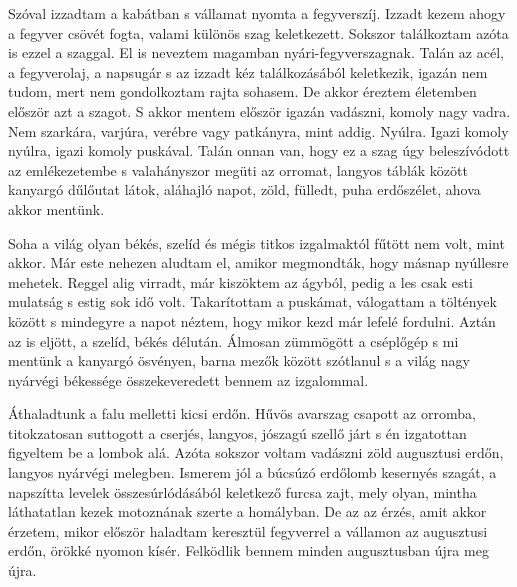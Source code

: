 \documentclass{IEEEtran}
\begin{document}
Szóval izzadtam a kabátban s vállamat nyomta a fegyverszíj. Izzadt kezem ahogy a fegyver csövét fogta, valami különös szag keletkezett. Sokszor találkoztam azóta is ezzel a szaggal. El is neveztem magamban nyári-fegyverszagnak. Talán az acél, a fegyverolaj, a napsugár s az izzadt kéz találkozásából keletkezik, igazán nem tudom, mert nem gondolkoztam rajta sohasem. De akkor éreztem életemben először azt a szagot. S akkor mentem először igazán vadászni, komoly nagy vadra. Nem szarkára, varjúra, verébre vagy patkányra, mint addig. Nyúlra. Igazi komoly nyúlra, igazi komoly puskával. Talán onnan van, hogy ez a szag úgy beleszívódott az emlékezetembe s valahányszor megüti az orromat, langyos táblák között kanyargó dűlőutat látok, aláhajló napot, zöld, fülledt, puha erdőszélet, ahova akkor mentünk.

Soha a világ olyan békés, szelíd és mégis titkos izgalmaktól fűtött nem volt, mint akkor. Már este nehezen aludtam el, amikor megmondták, hogy másnap nyúllesre mehetek. Reggel alig virradt, már kiszöktem az ágyból, pedig a les csak esti mulatság s estig sok idő volt. Takarítottam a puskámat, válogattam a töltények között s mindegyre a napot néztem, hogy mikor kezd már lefelé fordulni. Aztán az is eljött, a szelíd, békés délután. Álmosan zümmögött a cséplőgép s mi mentünk a kanyargó ösvényen, barna mezők között szótlanul s a világ nagy nyárvégi békessége összekeveredett bennem az izgalommal.

Áthaladtunk a falu melletti kicsi erdőn. Hűvös avarszag csapott az orromba, titokzatosan suttogott a cserjés, langyos, jószagú szellő járt s én izgatottan figyeltem be a lombok alá. Azóta sokszor voltam vadászni zöld augusztusi erdőn, langyos nyárvégi melegben. Ismerem jól a búcsúzó erdőlomb kesernyés szagát, a napszítta levelek összesúrlódásából keletkező furcsa zajt, mely olyan, mintha láthatatlan kezek motoznának szerte a homályban. De az az érzés, amit akkor érzetem, mikor először haladtam keresztül fegyverrel a vállamon az augusztusi erdőn, örökké nyomon kísér. Felködlik bennem minden augusztusban újra meg újra.
\end{document}
